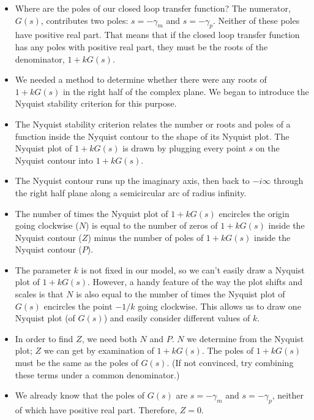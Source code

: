 \documentclass{article}
\begin{document}
\begin{itemize}

\item Where are the poles of our closed loop transfer function? The numerator, $G(s)$, contributes two poles: $s=-\gamma_m$ and $s=-\gamma_p$. Neither of these poles have positive real part. That means that if the closed loop transfer function has any poles with positive real part, they must be the roots of the denominator, $1+kG(s)$.

\item We needed a method to determine whether there were any roots of $1+kG(s)$ in the right half of the complex plane. We began to introduce the Nyquist stability criterion for this purpose.

\item The Nyquist stability criterion relates the number or roots and poles of a function inside the Nyquist contour to the shape of its Nyquist plot. The Nyquist plot of $1+kG(s)$ is drawn by plugging every point $s$ on the Nyquist contour into $1+kG(s)$.

\item The Nyquist contour runs up the imaginary axis, then back to $-i\infty$ through the right half plane along a semicircular arc of radius infinity.

\item The number of times the Nyquist plot of $1+kG(s)$ encircles the origin going clockwise ($N$) is equal to the number of zeros of $1+kG(s)$ inside the Nyquist contour ($Z$) minus the number of poles of $1+kG(s)$ inside the Nyquist contour ($P$).

\item The parameter $k$ is not fixed in our model, so we can't easily draw a Nyquist plot of $1+kG(s)$. However, a handy feature of the way the plot shifts and scales is that $N$ is also equal to the number of times the Nyquist plot of $G(s)$ encircles the point $-1/k$ going clockwise. This allows us to draw one Nyquist plot (of $G(s)$) and easily consider different values of $k$.

\item In order to find $Z$, we need both $N$ and $P$. $N$ we determine from the Nyquist plot; $Z$ we can get by examination of $1+kG(s)$. The poles of $1+kG(s)$ must be the same as the poles of $G(s)$. (If not convinced, try combining these terms under a common denominator.)

\item We already know that the poles of $G(s)$ are $s=-\gamma_m$ and $s=-\gamma_p$, neither of which have positive real part. Therefore, $Z=0$.


\end{itemize}
\end{document}
